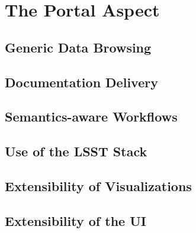 \section{The Portal Aspect}\label{portal-aspect}

\subsection{Generic Data Browsing}\label{generic-data-browsing}

\subsection{Documentation Delivery}\label{documentation-delivery}

\subsection{Semantics-aware Workflows}\label{semantics-aware-workflows}

\subsection{Use of the LSST Stack}\label{use-of-the-lsst-stack}

\subsection{Extensibility of Visualizations}\label{extensibility-of-visualizations}

\subsection{Extensibility of the UI}\label{extensibility-of-the-ui}


